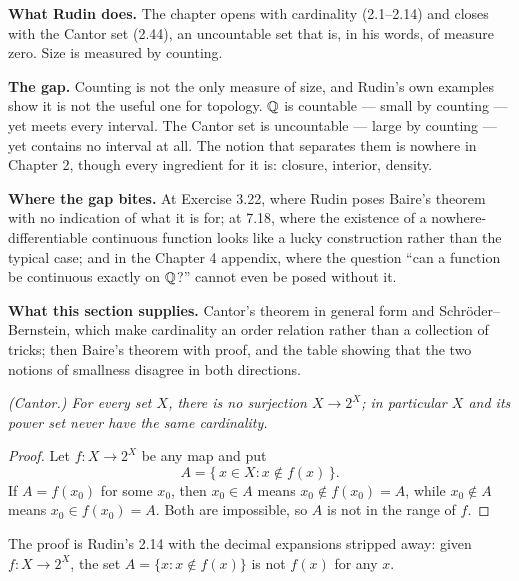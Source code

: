 \begin{roadmap}
\raggedright
\textbf{What Rudin does.} The chapter opens with cardinality (2.1--2.14) and
closes with the Cantor set (2.44), an uncountable set that is, in his words,
of measure zero. Size is measured by counting.

\smallskip
\textbf{The gap.} Counting is not the only measure of size, and Rudin's own
examples show it is not the useful one for topology. $\mathbb{Q}$ is countable ---
small by counting --- yet meets every interval. The Cantor set is
uncountable --- large by counting --- yet contains no interval at all. The
notion that separates them is nowhere in Chapter 2, though every ingredient
for it is: closure, interior, density.

\smallskip
\textbf{Where the gap bites.} At Exercise 3.22, where Rudin poses Baire's
theorem with no indication of what it is for; at 7.18, where the existence of
a nowhere-differentiable continuous function looks like a lucky construction
rather than the typical case; and in the Chapter 4 appendix, where the
question ``can a function be continuous exactly on $\mathbb{Q}$?'' cannot even be
posed without it.

\smallskip
\textbf{What this section supplies.} Cantor's theorem in general form and
Schr\"oder--Bernstein, which make cardinality an order relation rather than a
collection of tricks; then Baire's theorem with proof, and the table showing
that the two notions of smallness disagree in both directions.
\end{roadmap}

\emph{(Cantor.) For every set $X$, there is no surjection $X \to 2^X$; in
particular $X$ and its power set never have the same cardinality.}
\begin{proof}
Let $f : X \to 2^X$ be any map and put
\[ A = \{\,x \in X : x \notin f(x)\,\} . \]
If $A = f(x_0)$ for some $x_0$, then $x_0 \in A$ means $x_0 \notin f(x_0) =
A$, while $x_0 \notin A$ means $x_0 \in f(x_0) = A$. Both are impossible, so
$A$ is not in the range of $f$.
\end{proof}

\noindent
The proof is Rudin's 2.14 with the decimal expansions stripped away: given
$f : X \to 2^X$, the set $A = \{x : x \notin f(x)\}$ is not $f(x)$ for any
$x$.

